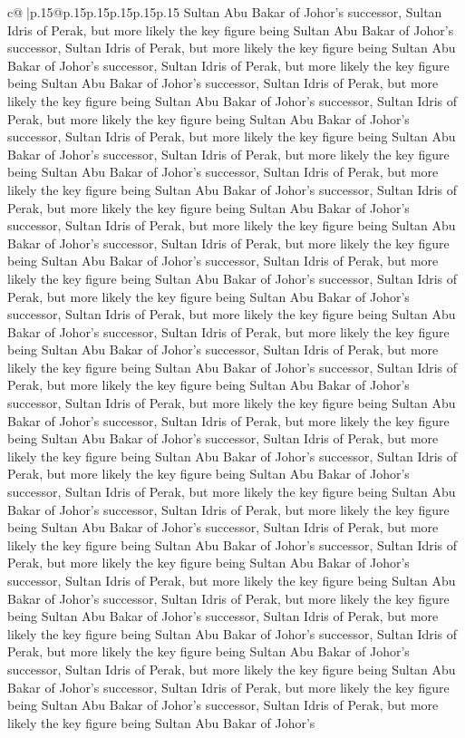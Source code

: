 \documentclass{article}
\begin{document}
{\begin{supertabular}{c@{$\;$}|p{.15\linewidth}@{}p{.15\linewidth}p{.15\linewidth}p{.15\linewidth}p{.15\linewidth}p{.15\linewidth}}
{{{Sultan Abu Bakar of Johor's successor, Sultan Idris of Perak, but more likely the key figure being Sultan Abu Bakar of Johor's successor, Sultan Idris of Perak, but more likely the key figure being Sultan Abu Bakar of Johor's successor, Sultan Idris of Perak, but more likely the key figure being Sultan Abu Bakar of Johor's successor, Sultan Idris of Perak, but more likely the key figure being Sultan Abu Bakar of Johor's successor, Sultan Idris of Perak, but more likely the key figure being Sultan Abu Bakar of Johor's successor, Sultan Idris of Perak, but more likely the key figure being Sultan Abu Bakar of Johor's successor, Sultan Idris of Perak, but more likely the key figure being Sultan Abu Bakar of Johor's successor, Sultan Idris of Perak, but more likely the key figure being Sultan Abu Bakar of Johor's successor, Sultan Idris of Perak, but more likely the key figure being Sultan Abu Bakar of Johor's successor, Sultan Idris of Perak, but more likely the key figure being Sultan Abu Bakar of Johor's successor, Sultan Idris of Perak, but more likely the key figure being Sultan Abu Bakar of Johor's successor, Sultan Idris of Perak, but more likely the key figure being Sultan Abu Bakar of Johor's successor, Sultan Idris of Perak, but more likely the key figure being Sultan Abu Bakar of Johor's successor, Sultan Idris of Perak, but more likely the key figure being Sultan Abu Bakar of Johor's successor, Sultan Idris of Perak, but more likely the key figure being Sultan Abu Bakar of Johor's successor, Sultan Idris of Perak, but more likely the key figure being Sultan Abu Bakar of Johor's successor, Sultan Idris of Perak, but more likely the key figure being Sultan Abu Bakar of Johor's successor, Sultan Idris of Perak, but more likely the key figure being Sultan Abu Bakar of Johor's successor, Sultan Idris of Perak, but more likely the key figure being Sultan Abu Bakar of Johor's successor, Sultan Idris of Perak, but more likely the key figure being Sultan Abu Bakar of Johor's successor, Sultan Idris of Perak, but more likely the key figure being Sultan Abu Bakar of Johor's successor, Sultan Idris of Perak, but more likely the key figure being Sultan Abu Bakar of Johor's successor, Sultan Idris of Perak, but more likely the key figure being Sultan Abu Bakar of Johor's successor, Sultan Idris of Perak, but more likely the key figure being Sultan Abu Bakar of Johor's successor, Sultan Idris of Perak, but more likely the key figure being Sultan Abu Bakar of Johor's successor, Sultan Idris of Perak, but more likely the key figure being Sultan Abu Bakar of Johor's successor, Sultan Idris of Perak, but more likely the key figure being Sultan Abu Bakar of Johor's successor, Sultan Idris of Perak, but more likely the key figure being Sultan Abu Bakar of Johor's successor, Sultan Idris of Perak, but more likely the key figure being Sultan Abu Bakar of Johor's successor, Sultan Idris of Perak, but more likely the key figure being Sultan Abu Bakar of Johor's successor, Sultan Idris of Perak, but more likely the key figure being Sultan Abu Bakar of Johor's successor, Sultan Idris of Perak, but more likely the key figure being Sultan Abu Bakar of Johor's }}}
\end{supertabular}}
\end{document}
